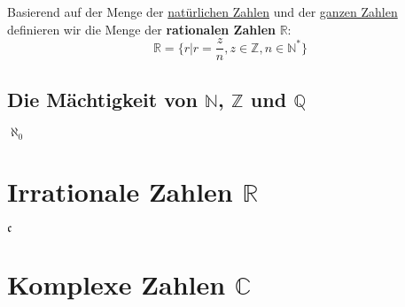 \documentclass[../../main.tex]{subfiles}
\begin{document}
		\begin{definition}
			Basierend auf der Menge der \hyperref[def:NatürlicheZahlen]{natürlichen Zahlen} und der \hyperref[def:GanzeZahlen]{ganzen Zahlen} definieren wir die Menge der \textbf{rationalen Zahlen} $\mathbb{R}$: $$\mathbb{R} = \{r | r = \frac{z}{n}, z \in \mathbb{Z}, n \in \mathbb{N}^* \}$$
		\end{definition}
	
	

		
		
		\subsection*{Die Mächtigkeit von $\mathbb{N}$, $\mathbb{Z}$ und $\mathbb{Q}$}
		
		$\aleph_0$
		
		\section{Irrationale Zahlen $\mathbb{R}$}
		
		$\mathfrak{c}$
		
		
		
		\section{Komplexe Zahlen $\mathbb{C}$}
		
	
\end{document}
